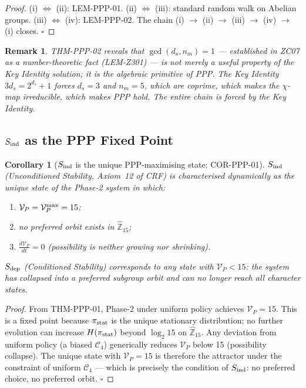 \documentclass[12pt, a4paper]{article}
\newtheorem{corollary}{Corollary}[section]
\newtheorem{remark}{Remark}[section]
\begin{document}
\begin{proof}
(i) $\Leftrightarrow$ (ii): LEM-PPP-01.
(ii) $\Leftrightarrow$ (iii): standard random walk on Abelian groups.
(iii) $\Leftrightarrow$ (iv): LEM-PPP-02.
The chain (i) $\to$ (ii) $\to$ (iii) $\to$ (iv) $\to$ (i) closes.
\hfill$\square$
\end{proof}

\begin{remark}
THM-PPP-02 reveals that $\gcd(d_s, n_m) = 1$ --- established in
ZC07 as a number-theoretic fact (LEM-Z301) --- is not merely a
useful property of the Key Identity solution; it is the
\emph{algebraic primitive of PPP}. The Key Identity
$3d_s = 2^{d_s}+1$ forces $d_s = 3$ and $n_m = 5$, which are
coprime, which makes the $\chi$-map irreducible, which makes
PPP hold. The entire chain is forced by the Key Identity.
\end{remark}

\subsection{$S_{\rm ind}$ as the PPP Fixed Point}
\label{sec:cor}

\begin{corollary}[$S_{\rm ind}$ is the unique PPP-maximising state;
  COR-PPP-01]
\label{cor:sind}
$S_{\rm ind}$ (Unconditioned Stability, Axiom~12 of CRF) is
characterised dynamically as the unique state of the
Phase-2 system in which:
\begin{enumerate}[leftmargin=*, label=(\roman*), noitemsep]
  \item $\mathcal{V}_P = \mathcal{V}_P^{\rm max} = 15$;
  \item no preferred orbit exists in $\hat{\mathbb{Z}}_{15}$;
  \item $\frac{d\mathcal{V}_P}{dt} = 0$ (possibility is neither
    growing nor shrinking).
\end{enumerate}
$S_{\rm dep}$ (Conditioned Stability) corresponds to any state with
$\mathcal{V}_P < 15$: the system has collapsed into a preferred
subgroup orbit and can no longer reach all character states.
\end{corollary}

\begin{proof}
From THM-PPP-01, Phase-2 under uniform policy achieves
$\mathcal{V}_P = 15$. This is a fixed point because $\pi_{\rm stat}$
is the unique stationary distribution; no further evolution can
increase $H(\pi_{\rm stat})$ beyond $\log_2 15$ on $\hat{\mathbb{Z}}_{15}$.
Any deviation from uniform policy (a biased $\mathcal{C}_4$)
generically reduces $\mathcal{V}_P$ below 15 (possibility collapse).
The unique state with $\mathcal{V}_P = 15$ is therefore the attractor
under the constraint of uniform $\mathcal{C}_4$ --- which is precisely
the condition of $S_{\rm ind}$: no preferred choice, no preferred
orbit. \hfill$\square$
\end{proof}
\end{document}
